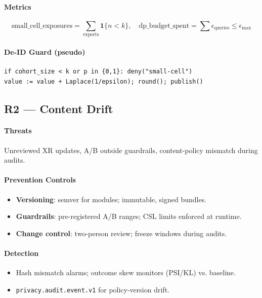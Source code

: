 \documentclass[11pt]{article}
\theoremstyle{plain}
\begin{document}
\paragraph{Metrics}
\[
\text{small\_cell\_exposures} = \sum_{\text{exports}} \mathbf{1}\{n<k\},\quad
\text{dp\_budget\_spent} = \sum \epsilon_{\text{queries}} \le \epsilon_{\max}
\]

\paragraph{De-ID Guard (pseudo)}
\begin{verbatim}
if cohort_size < k or p in {0,1}: deny("small-cell")
value := value + Laplace(1/epsilon); round(); publish()
\end{verbatim}

\subsection{R2 — Content Drift}
\paragraph{Threats}
Unreviewed XR updates, A/B outside guardrails, content-policy mismatch during audits.

\paragraph{Prevention Controls}
\begin{itemize}
  \item \textbf{Versioning}: semver for modules; immutable, signed bundles.
  \item \textbf{Guardrails}: pre-registered A/B ranges; CSL limits enforced at runtime.
  \item \textbf{Change control}: two-person review; freeze windows during audits.
\end{itemize}

\paragraph{Detection}
\begin{itemize}
  \item Hash mismatch alarms; outcome skew monitors (PSI/KL) vs. baseline.
  \item \texttt{privacy.audit.event.v1} for policy-version drift.
\end{itemize}
\end{document}
